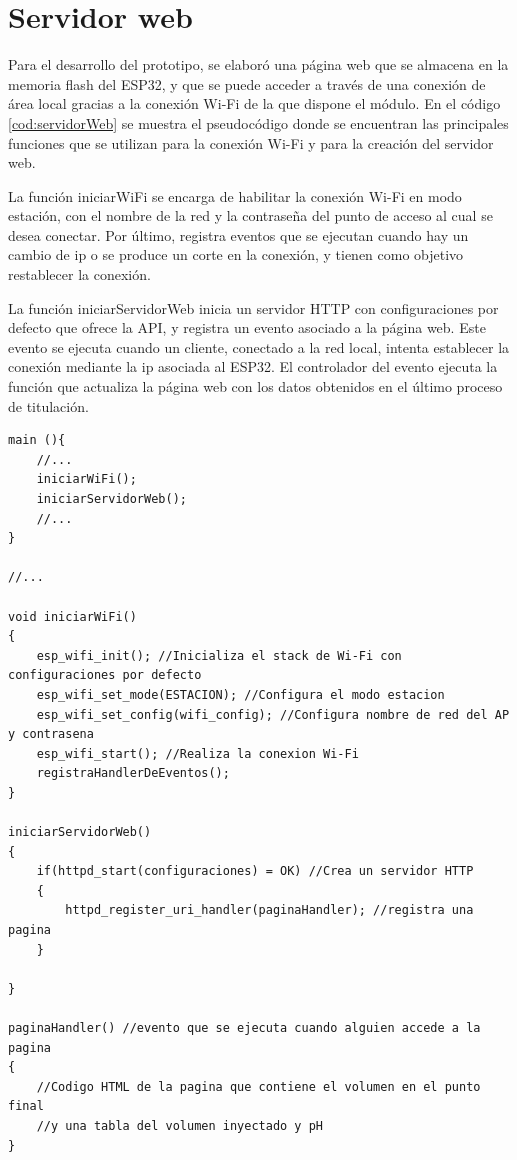 \section{Servidor web}

Para el desarrollo del prototipo, se elaboró una página web que se almacena en la memoria flash del ESP32, y que se puede acceder a través de una conexión de área local gracias a la conexión Wi-Fi de la que dispone el módulo. En el código \ref{cod:servidorWeb} se muestra el pseudocódigo donde se encuentran las principales funciones que se utilizan para la conexión Wi-Fi y para la creación del servidor web.

La función iniciarWiFi se encarga de habilitar la conexión Wi-Fi en modo estación, con el nombre de la red y la contraseña del punto de acceso al cual se desea conectar. Por último, registra eventos que se ejecutan cuando hay un cambio de ip o se produce un corte en la conexión, y tienen como objetivo restablecer la conexión.

La función iniciarServidorWeb inicia un servidor HTTP con configuraciones por defecto que ofrece la API, y registra un evento asociado a la página web. Este evento se ejecuta cuando un cliente, conectado a la red local, intenta establecer la conexión mediante la ip asociada al ESP32. El controlador del evento ejecuta la función que actualiza la página web con los datos obtenidos en el último proceso de titulación.


\begin{lstlisting}[label=cod:servidorWeb,caption=Pseudocódigo del servidor web.]
main (){
	//...
	iniciarWiFi();
	iniciarServidorWeb();
	//...
}

//...

void iniciarWiFi()
{
	esp_wifi_init(); //Inicializa el stack de Wi-Fi con configuraciones por defecto
	esp_wifi_set_mode(ESTACION); //Configura el modo estacion
	esp_wifi_set_config(wifi_config); //Configura nombre de red del AP y contrasena
	esp_wifi_start(); //Realiza la conexion Wi-Fi
	registraHandlerDeEventos();
}

iniciarServidorWeb()
{
	if(httpd_start(configuraciones) = OK) //Crea un servidor HTTP
	{
		httpd_register_uri_handler(paginaHandler); //registra una pagina
	}
	
}

paginaHandler() //evento que se ejecuta cuando alguien accede a la pagina
{
	//Codigo HTML de la pagina que contiene el volumen en el punto final
	//y una tabla del volumen inyectado y pH
}

\end{lstlisting}


